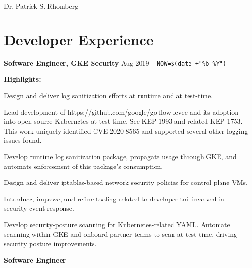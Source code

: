 \documentclass[10pt,letterpaper]{article}
\def\name{Dr. Patrick S. Rhomberg}
\renewenvironment{itemize}{
  \begin{list}{}{
    \setlength{\leftmargin}{1.5em}
    \setlength{\itemsep}{0.25em}
    \setlength{\parskip}{0pt}
    \setlength{\parsep}{0.25em}
  }
}{
  \end{list}
}
\begin{document}
{\huge \name}
\bigskip



\newcommand{\thinNewLineWithQuad}{\par\vspace{-.2em}\quad}

\newcommand{\jobtitle}[1]{\textbf{#1}}
\newcommand{\timeAtJob}[1]{\hspace{\fill}{#1}}
\newcommand{\workplace}[1]{\thinNewLineWithQuad{#1}}


\section*{Developer Experience}
\begin{itemize}
\item
  \jobtitle{Software Engineer, GKE Security}
  \hspace{\fill} {Aug 2019 -- \verb!NOW=$(date +"%b %Y")!} 
  \workplace{Google, LLC}
  \begin{itemize}
    \vspace{.5em}
  \item {\textbf{Highlights:}}
  \item\quad Design and deliver log sanitization efforts at runtime and at test-time.
    \item Lead development of https://github.com/google/go-flow-levee and its adoption into open-source Kubernetes at test-time.  See KEP-1993 and related KEP-1753.  This work uniquely identified CVE-2020-8565 and supported several other logging issues found.
    \item Develop runtime log sanitization package, propagate usage through GKE, and automate enforcement of this package's consumption. 
    \end{itemize}
  \item\quad Design and deliver iptables-based network security policies for control plane VMs.
  \item\quad Introduce, improve, and refine tooling related to developer toil involved in security event response.
  \item\quad Develop security-posture scanning for Kubernetes-related YAML.  Automate scanning within GKE and onboard partner teams to scan at test-time, driving security posture improvements.
  \end{itemize}
\item
  \jobtitle{Software Engineer}
  \hspace{\fill}{Jan 2017 -- Jun 2019}
\end{document}
